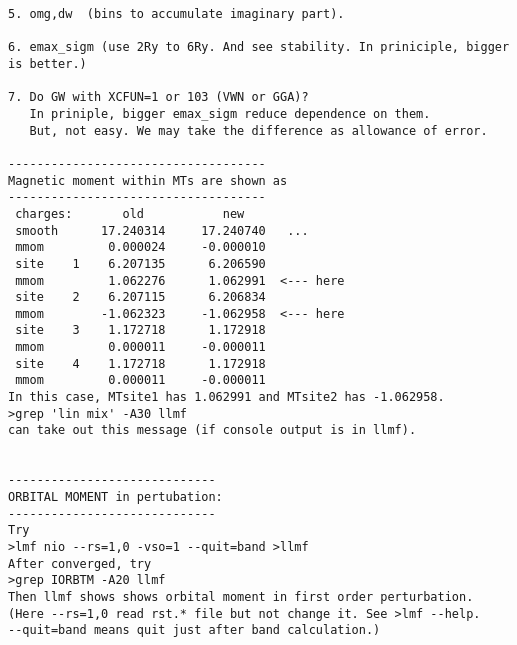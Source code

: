 \documentclass[a4paper,10pt,epsf,fleqn]{article}
\begin{document}
\begin{verbatim}
5. omg,dw  (bins to accumulate imaginary part).

6. emax_sigm (use 2Ry to 6Ry. And see stability. In priniciple, bigger is better.) 

7. Do GW with XCFUN=1 or 103 (VWN or GGA)?
   In priniple, bigger emax_sigm reduce dependence on them.
   But, not easy. We may take the difference as allowance of error.

------------------------------------
Magnetic moment within MTs are shown as
------------------------------------
 charges:       old           new     
 smooth      17.240314     17.240740   ...
 mmom         0.000024     -0.000010   
 site    1    6.207135      6.206590  
 mmom         1.062276      1.062991  <--- here
 site    2    6.207115      6.206834  
 mmom        -1.062323     -1.062958  <--- here
 site    3    1.172718      1.172918  
 mmom         0.000011     -0.000011  
 site    4    1.172718      1.172918  
 mmom         0.000011     -0.000011  
In this case, MTsite1 has 1.062991 and MTsite2 has -1.062958.
>grep 'lin mix' -A30 llmf 
can take out this message (if console output is in llmf).


-----------------------------
ORBITAL MOMENT in pertubation:
-----------------------------
Try 
>lmf nio --rs=1,0 -vso=1 --quit=band >llmf
After converged, try
>grep IORBTM -A20 llmf
Then llmf shows shows orbital moment in first order perturbation.
(Here --rs=1,0 read rst.* file but not change it. See >lmf --help.
--quit=band means quit just after band calculation.)

\end{verbatim}
\end{document}
